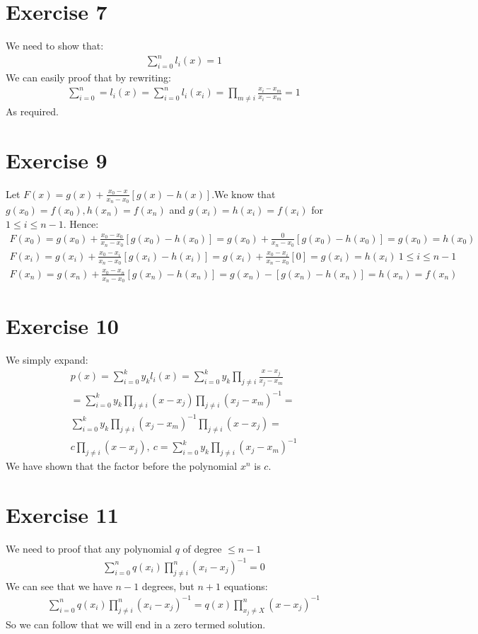 \section{Exercise 7}
We need to show that:
\begin{gather*}
\sum_{i = 0}^n l_i(x) = 1
\end{gather*}
We can easily proof that by rewriting:
\begin{gather*}
\sum_{i = 0}^n = l_i(x) = \sum_{i = 0}^n l_i(x_i) = \prod_{m \neq i} \frac{x_i - x_m}{x_i - x_m } = 1
\end{gather*}
As required.
\section{Exercise 9}
Let $F(x) = g(x) + \frac{x_0 -x}{x_n - x_0} [ g(x)  - h(x) ] $.We know that $g(x_0) = f(x_0) , h(x_n ) = f(x_n)$ and $g(x_i) = h(x_i) = f(x_i)$ for $ 1 \leq i \leq n-1$.
Hence:
\begin{gather*}
F(x_0) = g(x_0) + \frac{x_0 -x_0}{x_n - x_0} [ g(x_0) - h(x_0)] = g(x_0) + \frac{0}{x_n - x_0}[g(x_0) - h(x_0)] = g(x_0) = h(x_0)\\
F(x_i) =  g(x_i) + \frac{x_0 -x_i}{x_n - x_0} [ g(x_i) - h(x_i)] = g(x_i) + \frac{x_0 - x_i}{x_n - x_0}[0] = g(x_i) = h(x_i) ~ 1 \leq i \leq n-1 \\
F(x_n) = g(x_n) + \frac{x_0 -x_n}{x_n - x_0} [ g(x_n) - h(x_n)] = g(x_n) - [ g(x_n) - h(x_n) ] = h(x_n) = f(x_n)
\end{gather*}
\section{Exercise 10}
We simply expand:
\begin{gather*}
p(x) = \sum_{i=0}^k y_k l_i(x) = \sum_{i=0}^k y_k \prod_{j \neq i} \frac{x-x_j}{x_j - x_m} \\
= \sum_{i=0}^k y_k \prod_{j \neq i} (x-x_j) \prod_{j \neq i} (x_j - x_m)^{-1} = \\
\sum_{i=0}^k y_k \prod_{j \neq i} (x_j - x_m)^{-1} \prod_{j \neq i} (x-x_j) =\\
c \prod_{j \neq i} (x-x_j),~ c = \sum_{i=0}^k y_k \prod_{j \neq i} (x_j - x_m)^{-1}
\end{gather*}
We have shown that the factor before the polynomial $x^n$ is $c$.
\section{Exercise 11}
We need to proof that any polynomial $q$ of degree $\leq n-1$ 
\begin{gather*}
\sum_{i=0}^n q(x_i) \prod_{j \neq i}^n (x_i - x_j )^{-1} = 0
\end{gather*}
We can see that we have $n-1$ degrees, but $n+1$ equations:
\begin{gather*}
\sum_{i=0}^n q(x_i) \prod_{j \neq i}^n (x_i - x_j )^{-1} = q(x) \prod_{x_j \neq X}^n (x-x_j)^{-1}  
\end{gather*}
So we can follow that we will end in a zero termed solution.
